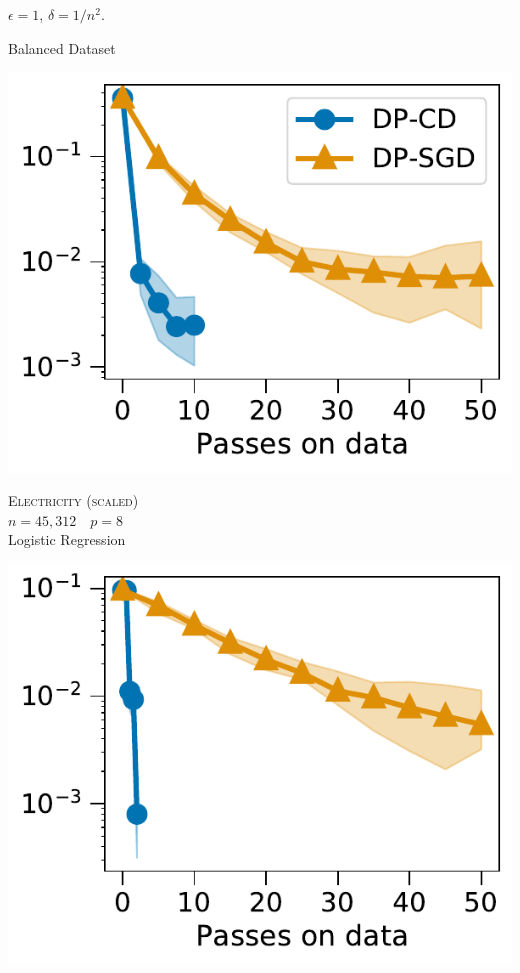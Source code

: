 \documentclass{beamer}
\begin{document}
\begin{frame}
  \vspace{1em}

  \begin{center}
    \Large $\epsilon = 1$, $\delta = 1 / n^2$.
  \end{center}
\end{frame}

\begin{frame}
  \begin{center}
    \Huge Balanced Dataset
  \end{center}

  \pause

  \vspace{1em}
  \begin{minipage}{0.5\linewidth}
    \includegraphics[width=\linewidth]{images/optimization_electricity_norm.pdf}%
    \begin{center}
      \normalsize
      \textsc{Electricity (scaled)} \\
      $n=45,312$~~$p=8$ \\
      Logistic Regression
    \end{center}
  \end{minipage}%
  \begin{minipage}{0.5\linewidth}
    \includegraphics[width=\linewidth]{images/optimization_california_norm.pdf}%

\end{minipage}
\end{frame}
\end{document}
